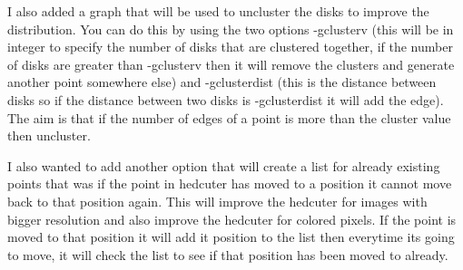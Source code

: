 \documentclass[11pt,a4paper]{article}
\begin{document}
I also added a graph that will be used to uncluster the disks to improve
the distribution. You can do this by using the two options -gclusterv
(this will be in integer to specify the number of disks that are
clustered together, if the number of disks are greater than -gclusterv
then it will remove the clusters and generate another point somewhere
else) and -gclusterdist (this is the distance between disks so if the
distance between two disks is -gclusterdist it will add the edge). The
aim is that if the number of edges of a point is more than the cluster
value then uncluster.



I also wanted to add another option that will create a list for already
existing points that was if the point in hedcuter has moved to a
position it cannot move back to that position again. This will improve
the hedcuter for images with bigger resolution and also improve the
hedcuter for colored pixels. If the point is moved to that position it
will add it position to the list then everytime its going to move, it
will check the list to see if that position has been moved to already.


\end{document}
